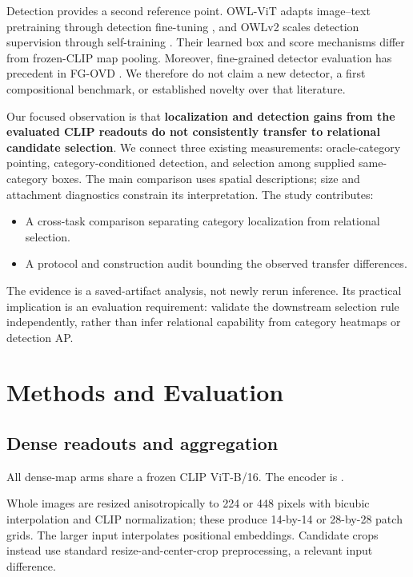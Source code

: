 \documentclass[10pt,twocolumn,letterpaper]{article}
\providecommand{\tightlist}{\setlength{\itemsep}{0pt}\setlength{\parskip}{0pt}}
\begin{document}
Detection provides a second reference point. OWL-ViT adapts image--text
pretraining through detection fine-tuning \citep{minderer2022owlvit},
and OWLv2 scales detection supervision through self-training
\citep{minderer2023owlv2}. Their learned box and score mechanisms differ
from frozen-CLIP map pooling. Moreover, fine-grained detector evaluation
has precedent in FG-OVD \citep{bianchi2023fgovd}. We therefore do not
claim a new detector, a first compositional benchmark, or established
novelty over that literature.

Our focused observation is that \textbf{localization and detection gains
from the evaluated CLIP readouts do not consistently transfer to
relational candidate selection}. We connect three existing measurements:
oracle-category pointing, category-conditioned detection, and selection
among supplied same-category boxes. The main comparison uses spatial
descriptions; size and attachment diagnostics constrain its
interpretation. The study contributes:

\begin{itemize}
\tightlist
\item
  A cross-task comparison separating category localization from
  relational selection.
\item
  A protocol and construction audit bounding the observed transfer
  differences.
\end{itemize}

The evidence is a saved-artifact analysis, not newly rerun inference.
Its practical implication is an evaluation requirement: validate the
downstream selection rule independently, rather than infer relational
capability from category heatmaps or detection AP.

\section{Methods and Evaluation}\label{methods-and-evaluation}

\subsection{Dense readouts and
aggregation}\label{dense-readouts-and-aggregation}

All dense-map arms share a frozen CLIP ViT-B/16. The encoder is
.

Whole images are resized anisotropically to 224 or 448 pixels with
bicubic interpolation and CLIP normalization; these produce 14-by-14 or
28-by-28 patch grids. The larger input interpolates positional
embeddings. Candidate crops instead use standard resize-and-center-crop
preprocessing, a relevant input difference.
\end{document}
